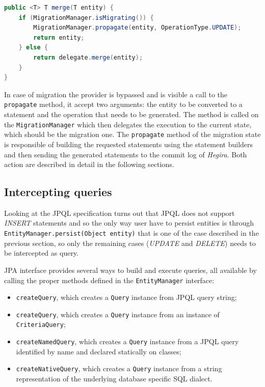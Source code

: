 \begin{lstlisting}[language=Java, caption=Integrate migration logic, label=code:isMigrating]
public <T> T merge(T entity) {
    if (MigrationManager.isMigrating()) {
        MigrationManager.propagate(entity, OperationType.UPDATE);
        return entity;
    } else {
        return delegate.merge(entity);
    }
}
\end{lstlisting}

\noindent In case of migration the provider is bypassed and is visible a call to the \texttt{propagate} method, it accept two arguments: the entity to be converted to a statement and the operation that needs to be generated. The method is called on the \texttt{MigrationManager} which then delegates the execution to the current state, which should be the migration one. The \texttt{propagate} method of the migration state is responsible of building the requested statements using the statement builders and then sending the generated statements to the commit log of \textit{Hegira}. Both action are described in detail in the following sections.

\subsection{Intercepting queries}
Looking at the JPQL specification \cite{book:projpa2} turns out that JPQL does not support \textit{INSERT} statements and so the only way user have to persist entities is through \texttt{EntityManager.persist(Object entity)} that is one of the case described in the previous section, so only the remaining cases (\textit{UPDATE} and \textit{DELETE}) needs to be intercepted as query.

\noindent JPA interface provides several ways to build and execute queries, all available by calling the proper methods defined in the \texttt{EntityManager} interface: 
\begin{itemize}
\item \texttt{createQuery}, which creates a \texttt{Query} instance from JPQL query string;
\item \texttt{createQuery}, which creates a \texttt{Query} instance from an instance of \texttt{CriteriaQuery};
\item \texttt{createNamedQuery}, which creates a \texttt{Query} instance from a JPQL query identified by name and declared statically on classes; 
\item \texttt{createNativeQuery}, which creates a \texttt{Query} instance from a string representation of the underlying database specific SQL dialect.
\end{itemize}
 
